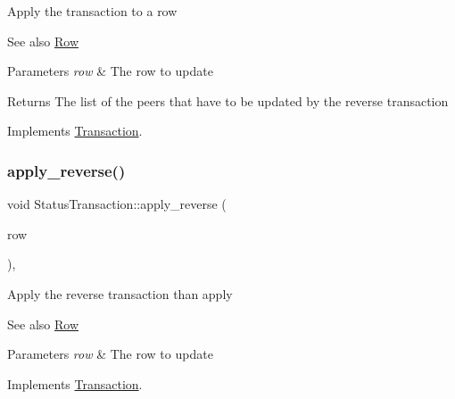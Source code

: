 Apply the transaction to a row \begin{DoxySeeAlso}{See also}
\mbox{\hyperlink{classRow}{Row}}
\end{DoxySeeAlso}

\begin{DoxyParams}{Parameters}
{\em row} & The row to update \\
\hline
\end{DoxyParams}
\begin{DoxyReturn}{Returns}
The list of the peers that have to be updated by the reverse transaction 
\end{DoxyReturn}


Implements \mbox{\hyperlink{classTransaction_a6ea269280c8cc641878f6e5775f270ca}{Transaction}}.

\mbox{\label{classStatusTransaction_abbb21cfeacda7753503f1fabeb9a3a87}} 
\subsubsection{\texorpdfstring{apply\+\_\+reverse()}{apply\_reverse()}}
{\footnotesize\ttfamily void Status\+Transaction\+::apply\+\_\+reverse (\begin{DoxyParamCaption}\item[{\mbox{\hyperlink{classRow}{Row}} $\ast$}]{row }\end{DoxyParamCaption})\hspace{0.3cm}{\ttfamily [override]}, {\ttfamily [virtual]}}

Apply the reverse transaction than apply \begin{DoxySeeAlso}{See also}
\mbox{\hyperlink{classRow}{Row}}
\end{DoxySeeAlso}

\begin{DoxyParams}{Parameters}
{\em row} & The row to update \\
\hline
\end{DoxyParams}


Implements \mbox{\hyperlink{classTransaction_a1ef3b245f37c217f50f8f76fceebca4a}{Transaction}}.

\mbox{\label{classStatusTransaction_ac920c5dfe6f75a650e74b92899310400}} 
